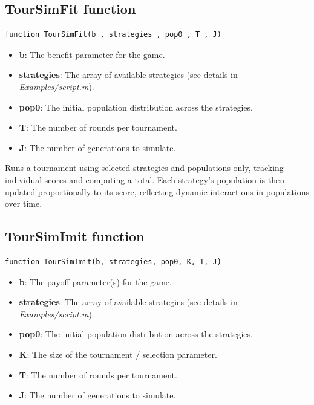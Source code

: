 \documentclass[12pt]{report}
\begin{document}
\subsection{TourSimFit function}

\begin{verbatim}
function TourSimFit(b , strategies , pop0 , T , J)
\end{verbatim}

\begin{itemize}
  \item \textbf{b}: The benefit parameter for the game.
  \item \textbf{strategies}: The array of available strategies (see details in \textit{Examples/script.m}).
  \item \textbf{pop0}: The initial population distribution across the strategies.
  \item \textbf{T}: The number of rounds per tournament.
  \item \textbf{J}: The number of generations to simulate.
\end{itemize}

Runs a tournament using selected strategies and populations only, tracking individual scores and computing a total. Each strategy's population is then updated proportionally to its score, reflecting dynamic interactions in populations over time.
\newpage
\subsection{TourSimImit function}

\begin{verbatim}
function TourSimImit(b, strategies, pop0, K, T, J)
\end{verbatim}

\begin{itemize}
  \item \textbf{b}: The payoff parameter(s) for the game.
  \item \textbf{strategies}: The array of available strategies (see details in \textit{Examples/script.m}).
  \item \textbf{pop0}: The initial population distribution across the strategies.
  \item \textbf{K}: The size of the tournament / selection parameter.
  \item \textbf{T}: The number of rounds per tournament.
  \item \textbf{J}: The number of generations to simulate.
\end{itemize}
\newpage
\end{document}
